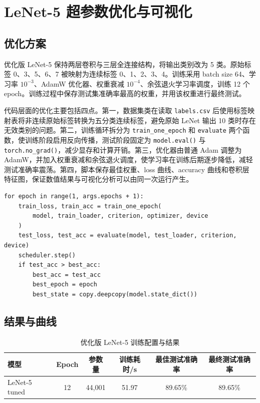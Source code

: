 \documentclass[UTF8]{ctexart}
\begin{document}
\section{LeNet-5 超参数优化与可视化}

\subsection{优化方案}

优化版 LeNet-5 保持两层卷积与三层全连接结构，将输出类别改为 5 类。原始标签 0、3、5、6、7 被映射为连续标签 0、1、2、3、4。训练采用 batch size 64、学习率 $10^{-3}$、AdamW 优化器、权重衰减 $10^{-4}$、余弦退火学习率调度，训练 12 个 epoch。训练过程中保存测试集准确率最高的权重，并用该权重进行最终测试。

代码层面的优化主要包括四点。第一，数据集类在读取 \texttt{labels.csv} 后使用标签映射表将非连续原始标签转换为五分类连续标签，避免原始 LeNet 输出 10 类时存在无效类别的问题。第二，训练循环拆分为 \texttt{train\_one\_epoch} 和 \texttt{evaluate} 两个函数，使训练阶段启用反向传播，测试阶段固定为 \texttt{model.eval()} 与 \texttt{torch.no\_grad()}，减少显存和计算开销。第三，优化器由普通 Adam 调整为 AdamW，并加入权重衰减和余弦退火调度，使学习率在训练后期逐步降低，减轻测试准确率震荡。第四，脚本保存最佳权重、loss 曲线、accuracy 曲线和卷积层特征图，保证数值结果与可视化分析可以由同一次运行产生。

\begin{lstlisting}[caption={优化版 LeNet-5 训练循环中的关键控制}]
for epoch in range(1, args.epochs + 1):
    train_loss, train_acc = train_one_epoch(
        model, train_loader, criterion, optimizer, device
    )
    test_loss, test_acc = evaluate(model, test_loader, criterion, device)
    scheduler.step()
    if test_acc > best_acc:
        best_acc = test_acc
        best_epoch = epoch
        best_state = copy.deepcopy(model.state_dict())
\end{lstlisting}

\subsection{结果与曲线}

\begin{table}[H]
\centering
\caption{优化版 LeNet-5 训练配置与结果}
\begin{tabular}{lccccc}
\toprule
模型 & Epoch & 参数量 & 训练耗时/s & 最佳测试准确率 & 最终测试准确率\\
\midrule
LeNet-5 tuned & 12 & 44,001 & 51.97 & 89.65\% & 89.65\%\\
\bottomrule
\end{tabular}
\end{table}
\end{document}
